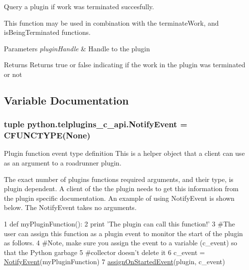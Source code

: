 Query a plugin if work was terminated succesfully. 

This function may be used in combination with the terminate\-Work, and is\-Being\-Terminated functions. 
\begin{DoxyParams}{Parameters}
{\em plugin\-Handle} & Handle to the plugin \\
\hline
\end{DoxyParams}
\begin{DoxyReturn}{Returns}
Returns true or false indicating if the work in the plugin was terminated or not 
\end{DoxyReturn}


\subsection{Variable Documentation}
\hypertarget{group__plugins_ga2a3c0a71c0c5e030bfda4f885e12f104}{
\subsubsection[{Notify\-Event}]{\setlength{\rightskip}{0pt plus 5cm}tuple python.\-telplugins\-\_\-c\-\_\-api.\-Notify\-Event = C\-F\-U\-N\-C\-T\-Y\-P\-E(None)}}\label{group__plugins_ga2a3c0a71c0c5e030bfda4f885e12f104}


Plugin function event type definition This is a helper object that a client can use as an argument to a roadrunner plugin. 

The exact number of plugins functions required arguments, and their type, is plugin dependent. A client of the the plugin needs to get this information from the plugin specific documentation. An example of using Notify\-Event is shown below. The Notify\-Event takes no arguments. 
\begin{DoxyCode}
1 \textcolor{keyword}{def }myPluginFunction():
2     \textcolor{keywordflow}{print} \textcolor{stringliteral}{'The plugin can call this function!'}
3  \textcolor{comment}{#The user can assign this function as a plugin event to monitor the start of the plugin as follows.}
4  \textcolor{comment}{#Note, make sure you assign the event to a variable (c\_event) so that the Python garbage}
5  \textcolor{comment}{#collector doesn't delete it}
6  c\_event = \hyperlink{group__plugins_ga2a3c0a71c0c5e030bfda4f885e12f104}{NotifyEvent}(myPluginFunction)
7  \hyperlink{group__plugins_gafdfeebd9388d22d44fcf4e1ab210172a}{assignOnStartedEvent}(plugin,  c\_event)
\end{DoxyCode}
 